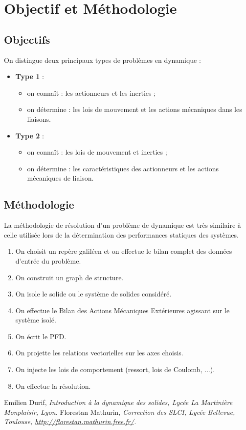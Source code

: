 \documentclass[10pt,fleqn]{article} %
\begin{document}
\section{Objectif et Méthodologie}

\subsection{Objectifs}
On distingue deux principaux types de problèmes en dynamique : 
\begin{itemize}
\item \textbf{Type 1} :
\begin{itemize}
\item on connaît : les actionneurs et les inerties ;
\item on détermine : les lois de mouvement et les actions mécaniques dans les liaisons.
\end{itemize} 
\item \textbf{Type 2} :
\begin{itemize}
\item on connaît : les lois de mouvement et inerties ;
\item on détermine : les caractéristiques des actionneurs et les actions mécaniques de liaison.
\end{itemize}
\end{itemize}

\subsection{Méthodologie}
La méthodologie de résolution d'un problème de dynamique est très similaire à celle utilisée lors de la détermination des performances statiques des systèmes.

\begin{enumerate}
\item On choisit un repère galiléen et on effectue le bilan complet des données d'entrée du problème.
\item On construit un graph de structure.
\item On isole le solide ou le système de solides considéré.
\item On effectue le Bilan des Actions Mécaniques Extérieures agissant sur le système isolé.
\item On écrit le PFD.
\item On projette les relations vectorielles sur les axes choisis.
\item On injecte les lois de comportement (ressort, lois de Coulomb, ...).
\item On effectue la résolution.
\end{enumerate}



\begin{thebibliography}{2}
    Emilien Durif, {\it Introduction à la dynamique des solides, Lycée La Martinière Monplaisir, Lyon.}
       Florestan Mathurin, {\it Correction des SLCI, Lycée Bellevue, Toulouse, \url{http://florestan.mathurin.free.fr/}.}



\end{thebibliography}
\end{document}
